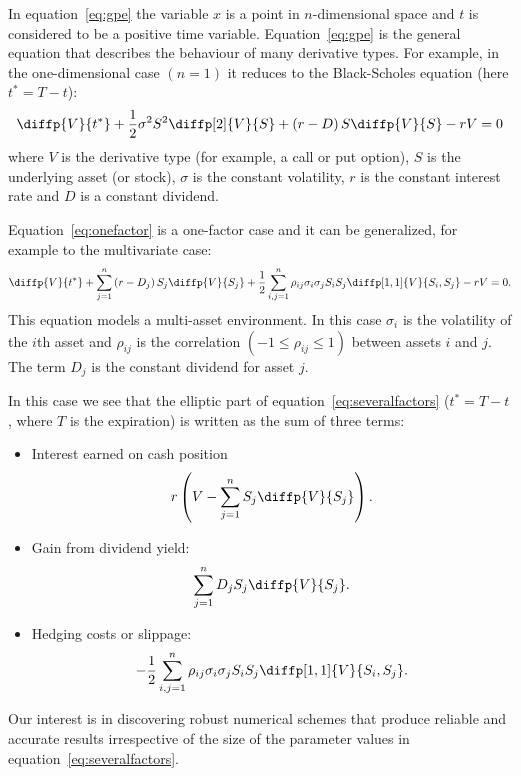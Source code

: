 \begin{frame}[t]{\subsecname}
In equation~\eqref{eq:gpe} the variable $x$ is a point in $n$-dimensional space and $t$ is considered to be a positive time variable. Equation~\eqref{eq:gpe} is the general equation that describes the behaviour of many derivative types. For example, in the one-dimensional case $\left(n=1\right)$ it reduces to the Black-Scholes equation (here $t^{\ast}=T-t$):
\begin{equation}\label{eq:onefactor}
\diffp{V}{t^{\ast}}+\frac{1}{2}\sigma^{2}S^{2}\diffp[2]{V}{S}+\left(r-D\right)S\diffp{V}{S}-rV=0
\end{equation}
where $V$ is the derivative type (for example, a call or put option), $S$ is the underlying asset (or stock), $\sigma$ is the constant volatility, $r$ is the constant interest rate and $D$ is a constant dividend.

Equation~\eqref{eq:onefactor} is a one-factor case and it can be generalized, for example to the multivariate case:
\begin{equation}\label{eq:severalfactors}
\diffp{V}{t^{\ast}}+\sum_{j=1}^{n}\left(r-D_{j}\right)S_{j}\diffp{V}{S_{j}}+\frac{1}{2}\sum_{i,j=1}^{n}\rho_{ij}\sigma_{i}\sigma_{j}S_{i}S_{j}\diffp[1,1]{V}{S_{i},S_{j}}-rV=0.
\end{equation}
This equation models a multi-asset environment. In this case $\sigma_{i}$ is the volatility of the $i$th asset and $\rho_{ij}$ is the correlation $\left(-1\leq\rho_{ij}\leq 1\right)$ between assets $i$ and $j$. The term $D_{j}$ is the constant dividend for asset $j$.
\end{frame}

\begin{frame}[t]{\subsecname}
 In this case we see that the elliptic part of equation~\eqref{eq:severalfactors} ($t^{\ast}=T-t$, where $T$ is the expiration) is written as the sum of three terms:
\begin{itemize}
	\item Interest earned on cash position \[ r\left(V-\sum_{j=1}^{n}S_{j}\diffp{V}{S_{j}}\right). \]
	\item Gain from dividend yield: \[ \sum_{j=1}^{n}D_{j}S_{j}\diffp{V}{S_{j}}. \]
	\item Hedging costs or slippage: \[ -\frac{1}{2}\sum_{i,j=1}^{n}\rho_{ij}\sigma_{i}\sigma_{j}S_{i}S_{j}\diffp[1,1]{V}{S_{i},S_{j}}. \]
\end{itemize}
Our interest is in discovering robust numerical schemes that produce reliable and accurate results irrespective of the size of the parameter values in equation~\eqref{eq:severalfactors}.
\end{frame}

